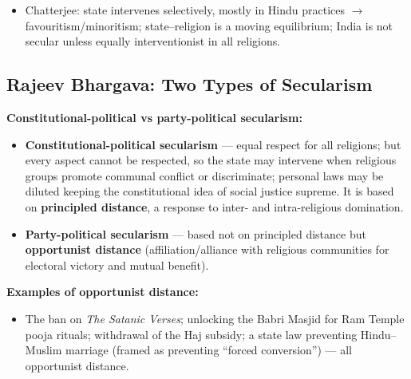 \begin{QuickRevision}
\begin{itemize}
\item Chatterjee: state intervenes selectively, mostly in Hindu practices $\rightarrow$ favouritism/minoritism; state--religion is a moving equilibrium; India is not secular unless equally interventionist in all religions.
\end{itemize}
\end{QuickRevision}

\sectiondivider

\subsection{Rajeev Bhargava: Two Types of Secularism}

\begin{KeyConcept}
\textbf{Constitutional-political vs party-political secularism:}
\begin{itemize}
\item \textbf{Constitutional-political secularism} --- equal respect for all religions; but every aspect cannot be respected, so the state may intervene when religious groups promote communal conflict or discriminate; personal laws may be diluted keeping the constitutional idea of social justice supreme. It is based on \textbf{principled distance}, a response to inter- and intra-religious domination.
\item \textbf{Party-political secularism} --- based not on principled distance but \textbf{opportunist distance} (affiliation/alliance with religious communities for electoral victory and mutual benefit).
\end{itemize}
\end{KeyConcept}

\begin{ExampleBox}
\textbf{Examples of opportunist distance:}
\begin{itemize}
\item The ban on \textit{The Satanic Verses}; unlocking the Babri Masjid for Ram Temple pooja rituals; withdrawal of the Haj subsidy; a state law preventing Hindu--Muslim marriage (framed as preventing ``forced conversion'') --- all opportunist distance.
\end{itemize}
\end{ExampleBox}

